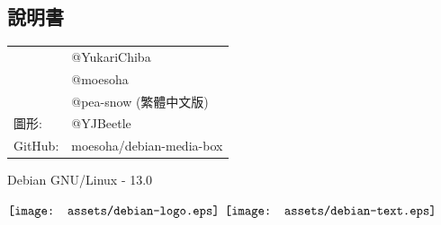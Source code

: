 \documentclass[UTF8]{article}
\begin{document}
\begin{multicols*}{3}



	\begin{tcolorbox}
	\section*{說明書}
	\end{tcolorbox}
	\begin{tabularx}{\linewidth}{@{}ll@{}}
		\multirow{2}{*}{}{編審：} & @YukariChiba\\
		~ & @moesoha \\
		~ & @pea-snow (繁體中文版)\\
		圖形: & @YJBeetle\\
		GitHub: & moesoha/debian-media-box\\
	\end{tabularx}

	\medskip


	\vfill
	\begin{flushright}
		Debian GNU/Linux - 13.0
		\linebreak
		\newline
		\begin{minipage}{0,5\textwidth}
			\centering
			$\vcenter{\hbox{\texttt{[image: assets/debian-logo.eps]}}}$
			$\vcenter{\hbox{\texttt{[image: assets/debian-text.eps]}}}$
		\end{minipage}
	\end{flushright}

\end{multicols*}
\end{document}
